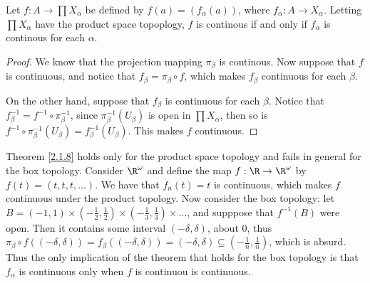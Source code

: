 \begin{theorem}\label{2.1.8}
    Let $f:A \rightarrow \prod{X_{\alpha}}$ be defined by $f(a)=(f_{\alpha}(a))$, where
    $f_{\alpha}:A \rightarrow X_{\alpha}$. Letting $\prod{X_{\alpha}}$ have the product space
    topoplogy, $f$ is continous if and only if  $f_{\alpha}$ is continous for each $\alpha$.
\end{theorem}
\begin{proof}
    We know that the projection mapping $\pi_{\beta}$ is continous. Now suppose that $f$ is
    continuous, and notice that  $f_{\beta}=\pi_{\beta} \circ f$, which makes $f_{\beta}$ continuous
    for each $\beta$.

    On the other hand, suppose that  $f_{\beta}$ is continuous for each $\beta$. Notice that
    $f_{\beta}^{-1}=f^{-1} \circ \pi_{\beta}^{-1}$, since $\pi_{\beta}^{-1}(U_{\beta})$ is open in
    $\prod{X_{\alpha}}$, then so is $f^{-1} \circ
    \pi_{\beta}^{-1}(U_{\beta})=f_{\beta}^{-1}(U_\beta)$. This makes $f$ continuous.
\end{proof}

\begin{example}
    Theorem \ref{2.1.8} holds only for the product space topology and fails in general for the box
    topology. Consider $\R^{\omega}$ and define the map $f:\R \rightarrow \R^{\omega}$ by
    $f(t)=(t,t,t, \dots)$. We have that $f_n(t)=t$ is continuous, which makes $f$ continuous under
    the product topology. Now consider the box topology: let  $B=(-1,1) \times
    (-\frac{1}{2},\frac{1}{2}) \times (-\frac{1}{3}, \frac{1}{3}) \times \dots$, and supppose that
    $f^{-1}(B)$ were open. Then it contains some interval $(-\delta,\delta)$, about $0$, thus
    $\pi_{\beta} \circ f((-\delta,\delta))=f_{\beta}((-\delta,\delta))=(-\delta,\delta) \subseteq
    (-\frac{1}{n}, \frac{1}{n})$, which is absurd. Thus the only implication of the theorem that
    holds for the box topology is that $f_{\alpha}$ is continuous only when $f$ is continuou is
    continuous.
\end{example} 

